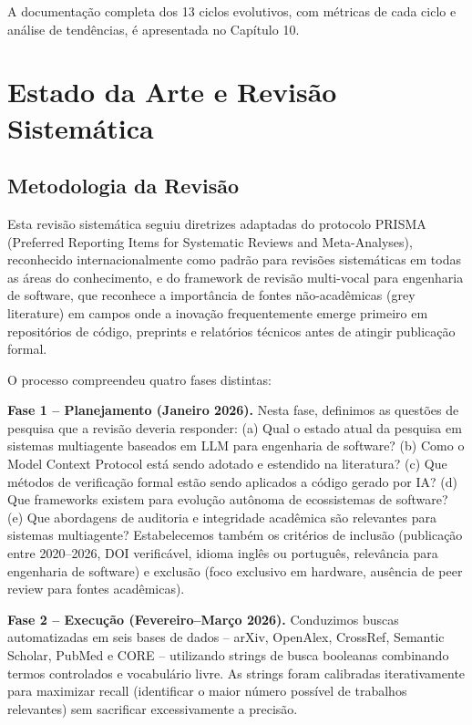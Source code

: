 \documentclass[12pt,a4paper,sumario=tradicional,openany]{abntex2}
\begin{document}
A documentação completa dos 13 ciclos evolutivos, com métricas de cada ciclo e análise de tendências, é apresentada no Capítulo 10.

\chapter{Estado da Arte e Revisão Sistemática}

\section{Metodologia da Revisão}

Esta revisão sistemática seguiu diretrizes adaptadas do protocolo PRISMA (Preferred Reporting Items for Systematic Reviews and Meta-Analyses), reconhecido internacionalmente como padrão para revisões sistemáticas em todas as áreas do conhecimento, e do framework de revisão multi-vocal para engenharia de software, que reconhece a importância de fontes não-acadêmicas (grey literature) em campos onde a inovação frequentemente emerge primeiro em repositórios de código, preprints e relatórios técnicos antes de atingir publicação formal.

O processo compreendeu quatro fases distintas:

\textbf{Fase 1 -- Planejamento (Janeiro 2026).} Nesta fase, definimos as questões de pesquisa que a revisão deveria responder: (a) Qual o estado atual da pesquisa em sistemas multiagente baseados em LLM para engenharia de software? (b) Como o Model Context Protocol está sendo adotado e estendido na literatura? (c) Que métodos de verificação formal estão sendo aplicados a código gerado por IA? (d) Que frameworks existem para evolução autônoma de ecossistemas de software? (e) Que abordagens de auditoria e integridade acadêmica são relevantes para sistemas multiagente? Estabelecemos também os critérios de inclusão (publicação entre 2020--2026, DOI verificável, idioma inglês ou português, relevância para engenharia de software) e exclusão (foco exclusivo em hardware, ausência de peer review para fontes acadêmicas).

\textbf{Fase 2 -- Execução (Fevereiro--Março 2026).} Conduzimos buscas automatizadas em seis bases de dados -- arXiv, OpenAlex, CrossRef, Semantic Scholar, PubMed e CORE -- utilizando strings de busca booleanas combinando termos controlados e vocabulário livre. As strings foram calibradas iterativamente para maximizar recall (identificar o maior número possível de trabalhos relevantes) sem sacrificar excessivamente a precisão.
\end{document}
